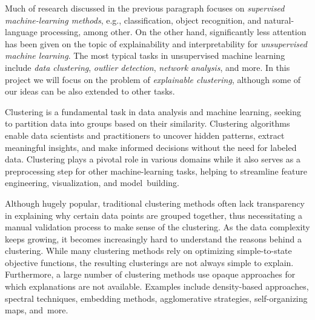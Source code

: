 \documentclass[a4paper,11pt]{article}
\begin{document}

Much of research discussed in the previous paragraph focuses on \emph{supervised machine-learning methods}, 
e.g., classification, object recognition, and natural-language processing, among other.
On the other hand, significantly less attention has been given on the 
topic of explainability and interpretability for \emph{unsupervised machine learning}.
The most typical tasks in unsupervised machine learning include
\emph{data clustering}, \emph{outlier detection}, \emph{network analysis}, and more. 
In this project we will focus on the problem of \emph{explainable clustering}, 
although some of our ideas can be also extended to other tasks.

Clustering is a fundamental task in data analysis and machine learning, 
seeking to partition data into groups based on their similarity.
Clustering algorithms enable data scientists and practitioners
to uncover hidden patterns, extract meaningful insights, 
and make informed decisions without the need for labeled data. 
Clustering plays a pivotal role in various domains
while it also serves as a preprocessing step for other machine-learning tasks, 
helping to streamline feature engineering, visualization, and model~building.

Although hugely popular, 
traditional clustering methods often lack transparency in explaining 
why certain data points are grouped together, 
thus necessitating a manual validation process to make sense of the clustering. 
As the data complexity keeps growing, 
it becomes increasingly hard to understand the reasons behind a clustering.
While many clustering methods rely on optimizing simple-to-state objective functions, 
the resulting clusterings are not always simple to explain. 
Furthermore, a large number of clustering methods use opaque approaches
for which explanations are not available. 
Examples include density-based approaches, spectral techniques, embedding methods,  
agglomerative strategies, self-organizing maps, and~more.
\end{document}

